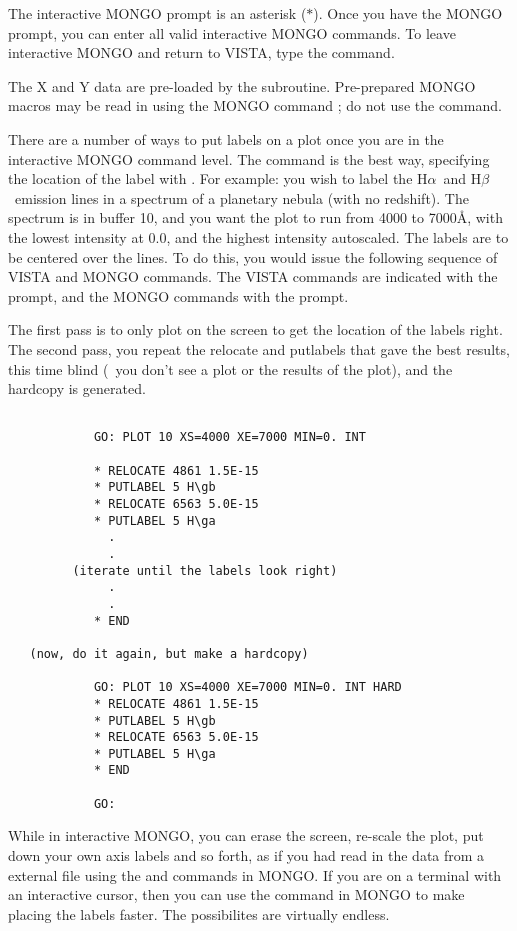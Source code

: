 The interactive MONGO prompt is an asterisk ($\ast$).  Once you have the MONGO
prompt, you can enter all valid interactive MONGO commands. To leave
interactive MONGO and return to VISTA, type the  command.

The X and Y data are pre-loaded by the  subroutine.  Pre-prepared
MONGO macros may be read in using the MONGO command ; do not use
the  command.

There are a number of ways to put labels on a plot once you are in the
interactive MONGO command level.  The  command is the best way,
specifying the location of the label with . For example:  you
wish to label the H$\alpha$\ and H$\beta$\ emission lines in a spectrum of a
planetary nebula (with no redshift).  The spectrum is in buffer 10, and you
want the plot to run from 4000 to 7000\AA, with the lowest intensity at 0.0,
and the highest intensity autoscaled.  The labels are to be centered over the
lines.  To do this, you would issue the following sequence of VISTA and MONGO
commands.  The VISTA commands are indicated with the  prompt, and
the MONGO commands with the \comm{*} prompt.

The first pass is to only plot on the screen to get the location of the
labels right.  The second pass, you repeat the relocate and putlabels
that gave the best results, this time blind (\ie\ you don't see a plot
or the results of the plot), and the hardcopy is generated.

\begin{verbatim}

            GO: PLOT 10 XS=4000 XE=7000 MIN=0. INT

            * RELOCATE 4861 1.5E-15
            * PUTLABEL 5 H\gb
            * RELOCATE 6563 5.0E-15
            * PUTLABEL 5 H\ga
              .
              .
         (iterate until the labels look right)
              .
              .
            * END

   (now, do it again, but make a hardcopy)

            GO: PLOT 10 XS=4000 XE=7000 MIN=0. INT HARD
            * RELOCATE 4861 1.5E-15
            * PUTLABEL 5 H\gb
            * RELOCATE 6563 5.0E-15
            * PUTLABEL 5 H\ga
            * END

            GO:

\end{verbatim}

While in interactive MONGO, you can erase the screen, re-scale the plot, put
down your own axis labels and so forth, as if you had read in the data from a
external file using the  and  commands in MONGO.
If you are on a terminal with an interactive cursor, then you can use the
 command in MONGO to make placing the labels faster.  The
possibilites are virtually endless.


